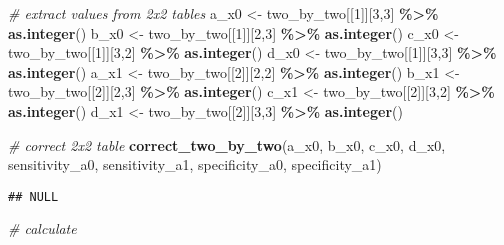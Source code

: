 \documentclass[
]{book}
\newenvironment{Shaded}{\begin{snugshade}}{\end{snugshade}}
\newcommand{\CommentTok}[1]{\textcolor[rgb]{0.56,0.35,0.01}{\textit{#1}}}
\newcommand{\DecValTok}[1]{\textcolor[rgb]{0.00,0.00,0.81}{#1}}
\newcommand{\FunctionTok}[1]{\textcolor[rgb]{0.13,0.29,0.53}{\textbf{#1}}}
\newcommand{\NormalTok}[1]{#1}
\newcommand{\OtherTok}[1]{\textcolor[rgb]{0.56,0.35,0.01}{#1}}
\newcommand{\SpecialCharTok}[1]{\textcolor[rgb]{0.81,0.36,0.00}{\textbf{#1}}}
\begin{document}
\begin{Shaded}
\begin{Highlighting}[]
\CommentTok{\# extract values from 2x2 tables}
\NormalTok{a\_x0 }\OtherTok{\textless{}{-}}\NormalTok{ two\_by\_two[[}\DecValTok{1}\NormalTok{]][}\DecValTok{3}\NormalTok{,}\DecValTok{3}\NormalTok{] }\SpecialCharTok{\%\textgreater{}\%} \FunctionTok{as.integer}\NormalTok{()}
\NormalTok{b\_x0 }\OtherTok{\textless{}{-}}\NormalTok{ two\_by\_two[[}\DecValTok{1}\NormalTok{]][}\DecValTok{2}\NormalTok{,}\DecValTok{3}\NormalTok{] }\SpecialCharTok{\%\textgreater{}\%} \FunctionTok{as.integer}\NormalTok{()}
\NormalTok{c\_x0 }\OtherTok{\textless{}{-}}\NormalTok{ two\_by\_two[[}\DecValTok{1}\NormalTok{]][}\DecValTok{3}\NormalTok{,}\DecValTok{2}\NormalTok{] }\SpecialCharTok{\%\textgreater{}\%} \FunctionTok{as.integer}\NormalTok{()}
\NormalTok{d\_x0 }\OtherTok{\textless{}{-}}\NormalTok{ two\_by\_two[[}\DecValTok{1}\NormalTok{]][}\DecValTok{3}\NormalTok{,}\DecValTok{3}\NormalTok{] }\SpecialCharTok{\%\textgreater{}\%} \FunctionTok{as.integer}\NormalTok{()}
\NormalTok{a\_x1 }\OtherTok{\textless{}{-}}\NormalTok{ two\_by\_two[[}\DecValTok{2}\NormalTok{]][}\DecValTok{2}\NormalTok{,}\DecValTok{2}\NormalTok{] }\SpecialCharTok{\%\textgreater{}\%} \FunctionTok{as.integer}\NormalTok{()}
\NormalTok{b\_x1 }\OtherTok{\textless{}{-}}\NormalTok{ two\_by\_two[[}\DecValTok{2}\NormalTok{]][}\DecValTok{2}\NormalTok{,}\DecValTok{3}\NormalTok{] }\SpecialCharTok{\%\textgreater{}\%} \FunctionTok{as.integer}\NormalTok{()}
\NormalTok{c\_x1 }\OtherTok{\textless{}{-}}\NormalTok{ two\_by\_two[[}\DecValTok{2}\NormalTok{]][}\DecValTok{3}\NormalTok{,}\DecValTok{2}\NormalTok{] }\SpecialCharTok{\%\textgreater{}\%} \FunctionTok{as.integer}\NormalTok{()}
\NormalTok{d\_x1 }\OtherTok{\textless{}{-}}\NormalTok{ two\_by\_two[[}\DecValTok{2}\NormalTok{]][}\DecValTok{3}\NormalTok{,}\DecValTok{3}\NormalTok{] }\SpecialCharTok{\%\textgreater{}\%} \FunctionTok{as.integer}\NormalTok{()}

\CommentTok{\# correct 2x2 table }
\FunctionTok{correct\_two\_by\_two}\NormalTok{(a\_x0, b\_x0, c\_x0, d\_x0, sensitivity\_a0, sensitivity\_a1, specificity\_a0, specificity\_a1)}
\end{Highlighting}
\end{Shaded}

\begin{verbatim}
## NULL
\end{verbatim}

\begin{Shaded}
\begin{Highlighting}[]
\CommentTok{\# calculate }
\end{Highlighting}
\end{Shaded}
\end{document}
